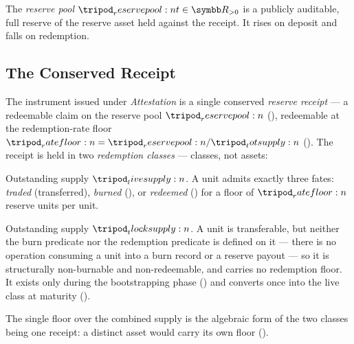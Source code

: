 \documentclass[../main.tex]{subfiles}
\begin{document}
\begin{definition}
    \label{def:model:reserve-pool}
    The \emph{reserve pool} $\reservepool{t} \in \R_{>0}$ is a publicly auditable, full
    reserve of the reserve asset held against the receipt. It rises on deposit and falls on
    redemption.
\end{definition}

\subsection{The Conserved Receipt}
\label{sec:model:claim}

\begin{definition}[Classes]
    \label{def:model:classes}
    The instrument issued under \emph{Attestation} is a single conserved
    \emph{reserve receipt} --- a redeemable claim
    on the reserve pool $\reservepool{}$ (), redeemable at the
    redemption-rate floor $\ratefloor{} = \reservepool{}/\totsupply{}$
    (). The receipt is held in two \emph{redemption classes} ---
    classes, not assets:
    \begin{description}[nosep]
        \item[\textbf{Live class.}] Outstanding supply $\livesupply{}$. A \liveclass{} unit
            admits exactly three fates: \emph{traded} (transferred), \emph{burned}
            (), or \emph{redeemed}
            () for a floor of $\ratefloor{}$ reserve units
            per unit.
        \item[\textbf{Time-locked class.}] Outstanding supply $\tlocksupply{}$. A
            \tlockclass{} unit is transferable, but neither the burn predicate nor the
            redemption predicate is defined on it --- there is no operation consuming a
            \tlockclass{} unit into a burn record or a reserve payout --- so it is
            structurally non-burnable and non-redeemable, and carries no redemption floor.
            It exists only during the bootstrapping phase
            () and converts once into the live class at
            maturity ().
    \end{description}
    The single floor over the combined supply is the algebraic form of the two classes
    being one receipt: a distinct asset would carry its own floor
    ().
\end{definition}
\end{document}
